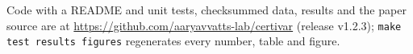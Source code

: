 Code with a README and unit tests, checksummed data, results and the paper source are at
\url{https://github.com/aaryavvatts-lab/certivar} (release v1.2.3); \texttt{make test results figures} regenerates
every number, table and figure.
